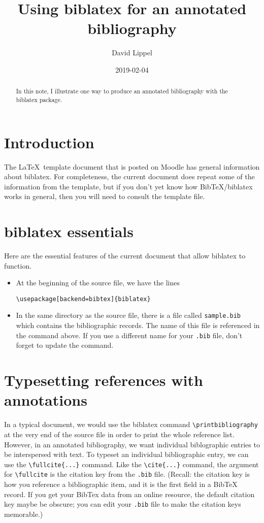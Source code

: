 \documentclass[11pt]{amsart}
\title{Using biblatex for an annotated bibliography}
\author{David Lippel}
\date{2019-02-04}
\begin{document}
\begin{abstract}       
In this note, I illustrate one way to produce an annotated bibliography with the biblatex package.
\end{abstract} 

\maketitle




\section{Introduction}

The \LaTeX\ template document that is posted on Moodle has general information about biblatex. 
For completeness, the current document does repeat some of the information from the template, 
but if you don't yet know how BibTeX/biblatex works in general, then you will need to consult the template file.

\section{biblatex essentials}

Here are the  essential features of the current document that allow biblatex to function.
\begin{itemize}
\item At the beginning of the source file, we have the lines
\begin{verbatim}
\usepackage[backend=bibtex]{biblatex}

\end{verbatim}
\item In the same directory as the source file, there is a file called \texttt{sample.bib} which contains the bibliographic records. 
The name of this file is referenced in the \verb++ command above. 
If you use a different name for your \texttt{.bib} file, don't forget to update the %
command.
\end{itemize}

\section{Typesetting references with annotations}

In a typical document, we would use the biblatex command \verb+\printbibliography+  
at the very end of the source file in order to print the whole reference list. 
However, in an annotated bibliography, we want individual biblographic entries to be interspersed with text. 
To typeset an individual bibliographic entry, we can use the \verb+\fullcite{...}+ command. 
Like the \verb+\cite{...}+ command, the argument for \verb+\fullcite+ is the citation key from the \texttt{.bib} file.
(Recall: the citation key is how you reference a bibliographic item, and it is the first field in a BibTeX record. 
If you get your BibTex data from an online resource,  the default citation key maybe be obscure;
you can edit your \texttt{.bib} file to make the citation keys memorable.)
\end{document}
